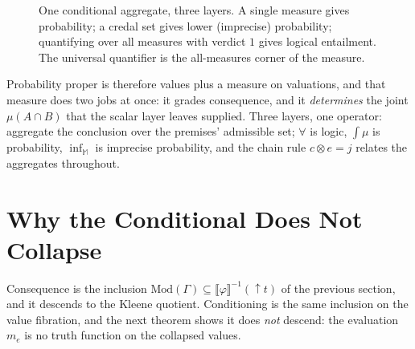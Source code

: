 \documentclass[11pt,a4paper]{article}
\newcommand{\conjc}{\otimes}
\newcommand{\val}[1]{\llbracket #1 \rrbracket}
\begin{document}
\begin{figure}[h]
\centering
{}
\caption{One conditional aggregate, three layers.  A single measure
gives probability; a credal set gives lower (imprecise) probability;
quantifying over all measures with verdict $1$ gives logical entailment.
The universal quantifier is the all-measures corner of the measure.}
\label{fig:three-layers}
\end{figure}

Probability proper is therefore values plus a measure on valuations, and
that measure does two jobs at once: it grades consequence, and it
\emph{determines} the joint $\mu(A\cap B)$ that the scalar layer leaves
supplied.  Three layers, one operator: aggregate the conclusion over the
premises' admissible set; $\forall$ is logic, $\int\mu$ is probability,
$\inf_{\mathbb{M}}$ is imprecise probability, and the chain rule
$c\conjc e=j$ relates the aggregates throughout.

\section{Why the Conditional Does Not Collapse}
\label{sec:no-cond-bridge}

Consequence is the inclusion $\mathrm{Mod}(\Gamma)\subseteq
\val{\varphi}^{-1}({\uparrow}t)$ of the previous section, and it
descends to the Kleene quotient.  Conditioning is the same inclusion on
the value fibration, and the next theorem shows it does \emph{not}
descend: the evaluation $m_e$ is no truth function on the collapsed
values.
\end{document}
